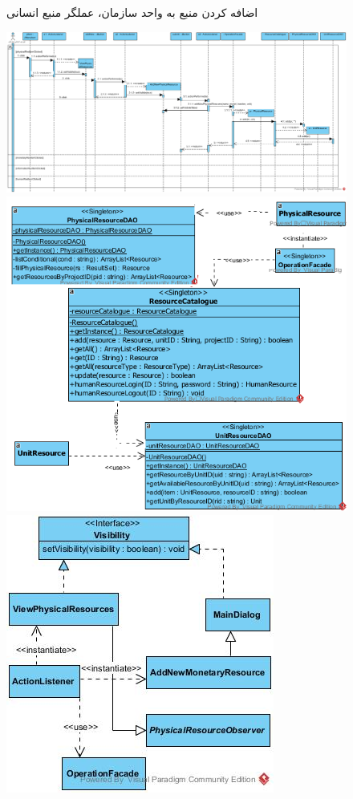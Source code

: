 \begin{landscape}
\begin{figure}[H]
	\caption{اضافه کردن منبع به واحد سازمان، عملگر منبع انسانی}
\end{figure}
\begin{figure}[H]
	\centering
	\includegraphics[scale=0.5]{img/sequence-design/AddResourceToUnit_PHYSICAL}
	\includegraphics[scale=0.5]{img/sequence-design/AddResourceToUnit_PHYSICALC}
	\includegraphics[scale=0.5]{img/sequence-design/AddResourceToUnit_PHYSICALUI}

\end{figure}
\end{landscape}
